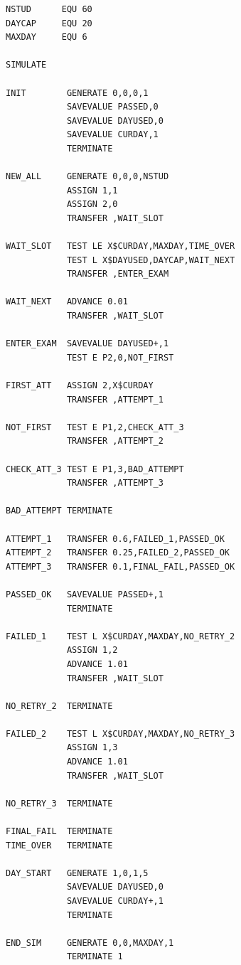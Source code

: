 \documentclass[a4paper, 14pt]{extarticle}
\begin{document}
\begin{longlisting}
\caption{Модель сдачи зачёта студентами в GPSS}
\begin{verbatim}
NSTUD      EQU 60
DAYCAP     EQU 20
MAXDAY     EQU 6

SIMULATE

INIT        GENERATE 0,0,0,1
            SAVEVALUE PASSED,0
            SAVEVALUE DAYUSED,0
            SAVEVALUE CURDAY,1
            TERMINATE

NEW_ALL     GENERATE 0,0,0,NSTUD
            ASSIGN 1,1
            ASSIGN 2,0
            TRANSFER ,WAIT_SLOT

WAIT_SLOT   TEST LE X$CURDAY,MAXDAY,TIME_OVER
            TEST L X$DAYUSED,DAYCAP,WAIT_NEXT
            TRANSFER ,ENTER_EXAM

WAIT_NEXT   ADVANCE 0.01
            TRANSFER ,WAIT_SLOT

ENTER_EXAM  SAVEVALUE DAYUSED+,1
            TEST E P2,0,NOT_FIRST

FIRST_ATT   ASSIGN 2,X$CURDAY
            TRANSFER ,ATTEMPT_1

NOT_FIRST   TEST E P1,2,CHECK_ATT_3
            TRANSFER ,ATTEMPT_2

CHECK_ATT_3 TEST E P1,3,BAD_ATTEMPT
            TRANSFER ,ATTEMPT_3

BAD_ATTEMPT TERMINATE

ATTEMPT_1   TRANSFER 0.6,FAILED_1,PASSED_OK
ATTEMPT_2   TRANSFER 0.25,FAILED_2,PASSED_OK
ATTEMPT_3   TRANSFER 0.1,FINAL_FAIL,PASSED_OK

PASSED_OK   SAVEVALUE PASSED+,1
            TERMINATE

FAILED_1    TEST L X$CURDAY,MAXDAY,NO_RETRY_2
            ASSIGN 1,2
            ADVANCE 1.01
            TRANSFER ,WAIT_SLOT

NO_RETRY_2  TERMINATE

FAILED_2    TEST L X$CURDAY,MAXDAY,NO_RETRY_3
            ASSIGN 1,3
            ADVANCE 1.01
            TRANSFER ,WAIT_SLOT

NO_RETRY_3  TERMINATE

FINAL_FAIL  TERMINATE
TIME_OVER   TERMINATE

DAY_START   GENERATE 1,0,1,5
            SAVEVALUE DAYUSED,0
            SAVEVALUE CURDAY+,1
            TERMINATE

END_SIM     GENERATE 0,0,MAXDAY,1
            TERMINATE 1
\end{verbatim}
\end{longlisting}
\end{document}

